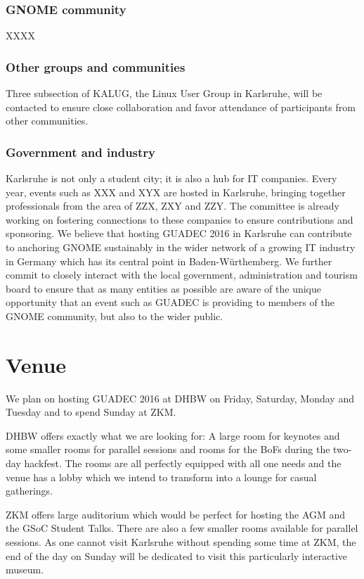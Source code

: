 \subsubsection{GNOME community}

XXXX


\subsubsection{Other groups and communities}

Three subsection of KALUG, the Linux User Group in Karlsruhe, will be contacted to ensure close collaboration and favor attendance of participants from other communities. 

\subsubsection{ Government and industry}

Karlsruhe is not only a student city; it is also a hub for IT companies. Every year, events such as XXX and XYX are hosted in Karlsruhe, bringing together professionals from the area of ZZX, ZXY and ZZY. The committee is already working on fostering connections to these companies to ensure contributions and sponsoring. We believe that hosting GUADEC 2016 in Karlsruhe can contribute to anchoring GNOME sustainably in the wider network of a growing IT industry in Germany which has its central point in Baden-Würthemberg. We further commit to closely interact with the local government, administration and tourism board to ensure that as many entities as possible are aware of the unique opportunity that an event such as GUADEC is providing to members of the GNOME community, but also to the wider public.  

\section{Venue}


We plan on hosting GUADEC 2016 at DHBW on Friday, Saturday, Monday and Tuesday and to spend Sunday at ZKM.

DHBW offers exactly what we are looking for: A large room for keynotes and some smaller rooms for parallel sessions and rooms for the BoFs during the two-day hackfest. The rooms are all perfectly equipped with all one needs and the venue has a lobby which we intend to transform into a lounge for casual gatherings. 

ZKM offers large auditorium which would be perfect for hosting the AGM and the GSoC Student Talks. There are also a few smaller rooms available for parallel sessions. As one cannot visit Karlsruhe without spending some time at ZKM, the end of the day on Sunday will be dedicated to visit this particularly interactive museum.


